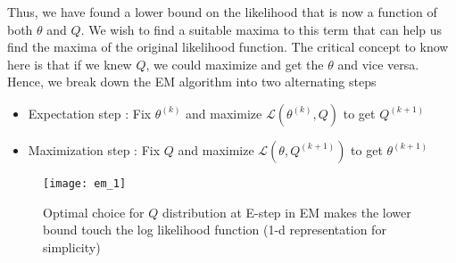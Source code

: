 \documentclass[../../statistical_learning_notes.tex]{subfiles}
\begin{document}
Thus, we have found a lower bound on the likelihood that is now a function of both $\theta$ and $Q$. We wish to find a suitable maxima to this term that can help us find the maxima of the original likelihood function. The critical concept to know here is that if we knew $Q$, we could maximize and get the $\theta$ and vice versa. Hence, we break down the EM algorithm into two alternating steps
\begin{itemize}
    \item Expectation step : Fix $\theta^{(k)}$ and maximize $\mathcal{L}(\theta^{(k)},Q)$ to get $Q^{(k+1)}$
    \item Maximization step : Fix $Q$ and maximize $\mathcal{L}(\theta, Q^{(k+1)})$ to get $\theta^{(k+1)}$
\end{itemize}

\begin{figure}[h]
\texttt{[image: em\_1]}
\centering
\caption{Optimal choice for $Q$ distribution at E-step in EM makes the lower bound touch the log likelihood function (1-d representation for simplicity)}
\label{fig:em_1} %
\end{figure}
\end{document}
